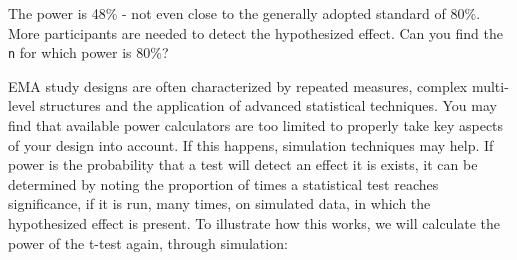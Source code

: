 \documentclass[]{book}
\newenvironment{Shaded}{\begin{snugshade}}{\end{snugshade}}
\newcommand{\KeywordTok}[1]{\textcolor[rgb]{0.13,0.29,0.53}{\textbf{#1}}}
\newcommand{\DecValTok}[1]{\textcolor[rgb]{0.00,0.00,0.81}{#1}}
\newcommand{\FloatTok}[1]{\textcolor[rgb]{0.00,0.00,0.81}{#1}}
\newcommand{\StringTok}[1]{\textcolor[rgb]{0.31,0.60,0.02}{#1}}
\newcommand{\CommentTok}[1]{\textcolor[rgb]{0.56,0.35,0.01}{\textit{#1}}}
\newcommand{\ControlFlowTok}[1]{\textcolor[rgb]{0.13,0.29,0.53}{\textbf{#1}}}
\newcommand{\OperatorTok}[1]{\textcolor[rgb]{0.81,0.36,0.00}{\textbf{#1}}}
\newcommand{\NormalTok}[1]{#1}
\begin{document}
The power is 48\% - not even close to the generally adopted standard of
80\%. More participants are needed to detect the hypothesized effect.
Can you find the \texttt{n} for which power is 80\%?

EMA study designs are often characterized by repeated measures, complex
multi-level structures and the application of advanced statistical
techniques. You may find that available power calculators are too
limited to properly take key aspects of your design into account. If
this happens, simulation techniques may help. If power is the
probability that a test will detect an effect it is exists, it can be
determined by noting the proportion of times a statistical test reaches
significance, if it is run, many times, on simulated data, in which the
hypothesized effect is present. To illustrate how this works, we will
calculate the power of the t-test again, through simulation:


\begin{Shaded}
\end{Shaded}
\end{document}
